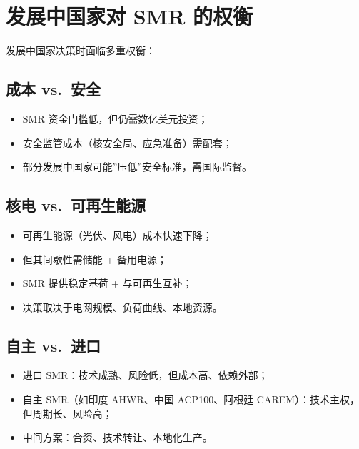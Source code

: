 \documentclass[
  UTF8,
  scheme=plain,
  fontsize=10pt,
  openany
]{ctexbook}
\begin{document}
\section{发展中国家对 SMR
的权衡}\label{ux53d1ux5c55ux4e2dux56fdux5bb6ux5bf9-smr-ux7684ux6743ux8861}

发展中国家决策时面临多重权衡：

\subsection{成本 vs.~安全}\label{ux6210ux672c-vs.-ux5b89ux5168}

\begin{itemize}
\tightlist
\item
  SMR 资金门槛低，但仍需数亿美元投资；
\item
  安全监管成本（核安全局、应急准备）需配套；
\item
  部分发展中国家可能''压低''安全标准，需国际监督。
\end{itemize}

\subsection{核电
vs.~可再生能源}\label{ux6838ux7535-vs.-ux53efux518dux751fux80fdux6e90}

\begin{itemize}
\tightlist
\item
  可再生能源（光伏、风电）成本快速下降；
\item
  但其间歇性需储能 + 备用电源；
\item
  SMR 提供稳定基荷 + 与可再生互补；
\item
  决策取决于电网规模、负荷曲线、本地资源。
\end{itemize}

\subsection{自主 vs.~进口}\label{ux81eaux4e3b-vs.-ux8fdbux53e3}

\begin{itemize}
\tightlist
\item
  进口 SMR：技术成熟、风险低，但成本高、依赖外部；
\item
  自主 SMR（如印度 AHWR、中国 ACP100、阿根廷
  CAREM）：技术主权，但周期长、风险高；
\item
  中间方案：合资、技术转让、本地化生产。
\end{itemize}
\end{document}
